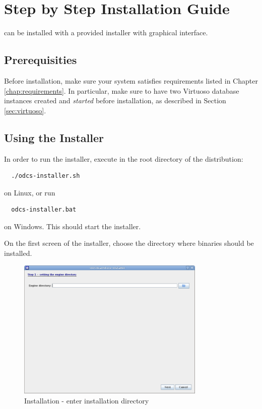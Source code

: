 \chapter{Step by Step Installation Guide}
\odcs can be installed with a provided installer with graphical interface.

\section{Prerequisities}
Before installation, make sure your system satisfies requirements listed in Chapter \ref{chap:requirements}. In particular, make sure to have two Virtuoso database instances created and \textit{started} before installation, as described in Section \ref{sec:virtuoso}.

\section{Using the Installer}
In order to run the installer, execute in the root directory of the distribution:
\begin{verbatim}
  ./odcs-installer.sh
\end{verbatim}
on Linux, or run
\begin{verbatim}
  odcs-installer.bat
\end{verbatim}
on Windows. This should start the installer.

On the first screen of the installer, choose the directory where \odcs binaries should be installed.

\begin{figure}[!h]
    \centering
    \includegraphics[width=0.8\textwidth]{images/install-step-01.png}
    \caption{Installation - enter installation directory}
\end{figure}

